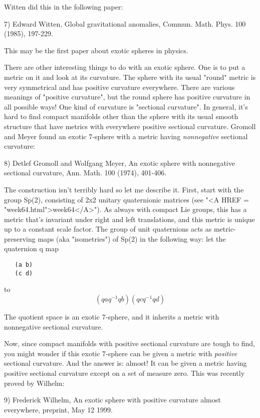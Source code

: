 Witten did this in the following paper:

7) Edward Witten, Global gravitational anomalies, Commun. Math. Phys.
100 (1985), 197-229.


This may be the first paper about exotic spheres in physics. 

There are other interesting things to do with an exotic sphere.  One is
to put a metric on it and look at its curvature.  The sphere with its
usual "round" metric is very symmetrical and has positive
curvature everywhere.  There are various meanings of "positive
curvature", but the round sphere has positive curvature in all
possible ways!  One kind of curvature is "sectional
curvature".  In general, it's hard to find compact manifolds other
than the sphere with its usual smooth structure that have metrics with
everywhere positive sectional curvature.  Gromoll and Meyer found an
exotic 7-sphere with a metric having \emph{nonnegative} sectional curvature:

8) Detlef Gromoll and Wolfgang Meyer, An exotic sphere with nonnegative 
sectional curvature, Ann. Math. 100 (1974), 401-406. 

The construction isn't terribly hard so let me describe it.  First,
start with the group Sp(2), consisting of 2x2 unitary quaternionic
matrices (see "<A HREF = "week64.html">week64</A>").  As
always with compact Lie groups, this has a metric that's invariant under
right and left translations, and this metric is unique up to a constant
scale factor.  The group of unit quaternions acts as metric-preserving
maps (aka "isometries") of Sp(2) in the following way: let the
quaternion q map
\begin{verbatim}
   (a b)  
   (c d)

\end{verbatim}
    
to 
$$
   (qaq^{-1}  qb)
   (qcq^{-1}  qd)
$$
    
The quotient space is an exotic 7-sphere, and it inherits a metric
with nonnegative sectional curvature.  

Now, since compact manifolds with positive sectional curvature are
tough to find, you might wonder if this exotic 7-sphere can be given 
a metric with \emph{positive} 
sectional curvature.  And the answer is: almost!
It can be given a metric having positive sectional curvature except on a
set of measure zero.  This was recently proved by Wilhelm:


9) Frederick Wilhelm, An exotic sphere with positive curvature 
almost everywhere, preprint, May 12 1999.

